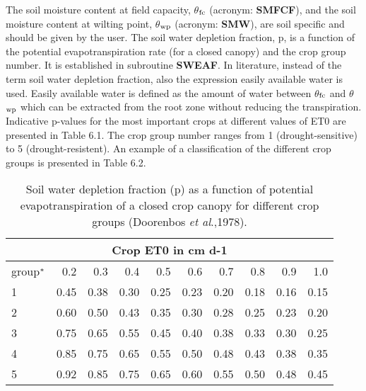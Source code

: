 The soil moisture content at field capacity, {\bf $\theta$$_{{\rm fc}}$} (acronym: {\bf SMFCF}), 
and the soil moisture content at wilting point, {\bf $\theta$$_{{\rm wp}}$} (acronym: {\bf SMW}), 
are soil specific and should be given by the user. The soil water depletion fraction, p, is 
a function of the potential evapotranspiration rate (for a closed canopy) and the crop group 
number. It is established in subroutine
{\bf SWEAF}. In literature, instead of the term soil water depletion fraction, also the 
expression easily available water is used. Easily available water is defined as the amount of
water between $\theta$$_{{\rm fc}}$ and $\theta$$_{{\rm wp}}$ which can be extracted from the root 
zone without reducing the
transpiration. Indicative p-values for the most important crops at different values of ET0
are presented in Table 6.1. The crop group number ranges from 1 (drought-sensitive) to 5
(drought-resistent). An example of a classification of the different crop groups is
presented in Table 6.2.

\begin{table}
\caption{Soil water depletion fraction (p) as a function of potential evapotranspiration 
of a closed crop canopy for different crop groups (Doorenbos {\it et al}.,1978).}
\label{tbl:soilwatdeplfraction}
\begin{tabularx}{\textwidth}{Xrrrrrrrrr}
\hline
\multicolumn{10}{c}{Crop ET0 in cm d-1}\\
\hline
group$^{\rm *}$ & 0.2 & 0.3 & 0.4 & 0.5 & 0.6 & 0.7 & 0.8 & 0.9 & 1.0\\
1 & 0.45 & 0.38 & 0.30 & 0.25 & 0.23 & 0.20 & 0.18 & 0.16 & 0.15\\
2 & 0.60 & 0.50 & 0.43 & 0.35 & 0.30 & 0.28 & 0.25 & 0.23 & 0.20\\
3 & 0.75 & 0.65 & 0.55 & 0.45 & 0.40 & 0.38 & 0.33 & 0.30 & 0.25\\
4 & 0.85 & 0.75 & 0.65 & 0.55 & 0.50 & 0.48 & 0.43 & 0.38 & 0.35\\
5 & 0.92 & 0.85 & 0.75 & 0.65 & 0.60 & 0.55 & 0.50 & 0.48 & 0.45\\
\hline 
\end{tabularx} 
\end{table}


